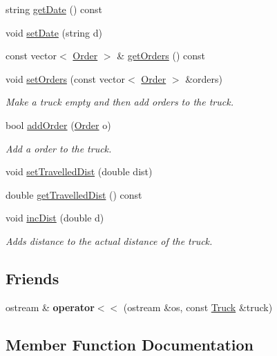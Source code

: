 \begin{DoxyCompactItemize}
string \hyperlink{class_truck_af27d980c66b104973ddac58ed64d3ddd}{get\+Date} () const
\item 
void \hyperlink{class_truck_a97755be533acca6e29f00c4ee1695d29}{set\+Date} (string d)
\item 
const vector$<$ \hyperlink{class_order}{Order} $>$ \& \hyperlink{class_truck_ac463b5227326e17da5f9dc087425d618}{get\+Orders} () const
\item 
void \hyperlink{class_truck_ac62db578f4c1cc35d889cfde61d695bb}{set\+Orders} (const vector$<$ \hyperlink{class_order}{Order} $>$ \&orders)
\begin{DoxyCompactList}\small\item\em Make a truck empty and then add orders to the truck. \end{DoxyCompactList}\item 
bool \hyperlink{class_truck_a0f9ac918d68526eacb91b63be3eefc56}{add\+Order} (\hyperlink{class_order}{Order} o)
\begin{DoxyCompactList}\small\item\em Add a order to the truck. \end{DoxyCompactList}\item 
void \hyperlink{class_truck_a3a1cf7bfe48843206b8e20b4bd32782f}{set\+Travelled\+Dist} (double dist)
\item 
double \hyperlink{class_truck_a7564742600274c25fd7cdd85d7e5391a}{get\+Travelled\+Dist} () const
\item 
void \hyperlink{class_truck_a42d199a149bb144de2da8163c8340c6c}{inc\+Dist} (double d)
\begin{DoxyCompactList}\small\item\em Adds distance to the actual distance of the truck. \end{DoxyCompactList}\end{DoxyCompactItemize}
\subsection*{Friends}
\begin{DoxyCompactItemize}
\item 
\mbox{\label{class_truck_adf379082533537dc5add3a9d55ccfcbb}} 
ostream \& {\bfseries operator$<$$<$} (ostream \&os, const \hyperlink{class_truck}{Truck} \&truck)
\end{DoxyCompactItemize}


\subsection{Member Function Documentation}
\mbox{\label{class_truck_a0f9ac918d68526eacb91b63be3eefc56}} 
